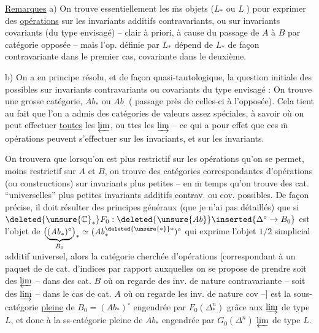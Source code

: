 
\uline{Remarques} a) On trouve essentiellement
les $\overline{\mathrm{m}}$s objets ($L_{\ast}$ ou $L_{\cdot}$) pour exprimer
des \uline{opérations} sur les invariants additifs
contravariants, ou sur invariants  covariants
(du type envisagé) -- 
clair à priori, à cause du passage
de $A$ à $B$ par  catégorie opposée
-- mais l'op. définie par $L_{\ast}$ dépend
de $L_{\ast}$ de façon contravariante dans le
premier cas, covariante dans le deuxième.

b) On a en principe résolu, et de façon
quasi-tautologique, la question initiale
des   possibles sur
invariants contravariants ou covariants
 du type envisagé : On trouve une
 grosse catégorie, $\mathit{Ab}_{\ast}$ ou $\mathit{Ab}_{\cdot}$ (
passage près de celles-ci à l'opposée). Cela
tient au fait que l'on a admis
des catégories  de valeurs  assez spéciales,
à savoir où on peut effectuer \uline{toutes}
les $\varprojlim$, ou ttes les $\varinjlim$ -- ce
qui a pour effet que ces $\overline{\mathrm m}$ opérations
peuvent s'effectuer sur les 
 invariants, et  sur les invariants.

On trouvera que lorsqu'on est plus
restrictif sur les opérations qu'on
se permet,   moins restrictif
sur $A$ et $B$, on trouve des catégories
correspondantes d'opérations (ou constructions)
sur invariants plus petites -- 
en $\overline{\mathrm m}$ temps qu'on trouve des cat.
``universelles'' plus petites  
invariants additifs contrav. ou cov.
possibles.  De façon précise, il doit
résulter des principes généraux (que je
n'ai pas détaillés) que si $\deleted{\unsure{\mathbb C}_{\ast}}F_0:\deleted{\unsure{\mathit{Ab}}}\inserted{\Delta^{\circ}\to B_0}$
est l'objet de $\bigl(\underbrace{(\mathit{Ab}_{\ast})^{\circ}}_{B_0}\bigr)_{\ast}
\simeq(\mathit{Ab}_{\ast}^{\deleted{\unsure{\ast}}\ast})^{\circ}$
qui exprime l'objet  $1/2$ simplicial
additif universel, alors la  catégorie
cherchée d'opérations [correspondant à
un paquet de de cat. d'indices par
rapport auxquelles on se propose de
prendre soit des $\varprojlim$ -- dans des cat.
$B$ où on regarde des inv. de nature
contravariante -- soit des $\varinjlim$ -- dans
le cas de cat. $A$ où on regarde les inv. de
nature cov --] est la sous-catégorie \uline{pleine}
 de $B_0=(\mathit{Ab}_{\ast})^{\circ}$ engendrée par  $F_0(\Delta_{\ast}^{n})$ grâce
aux $\varinjlim$ de type $L$, et  
donc à la ss-catégorie pleine de $\mathit{Ab}_{\ast}$
engendrée par  $G_0(\Delta^n)$   $\varprojlim$ de type $L$.
